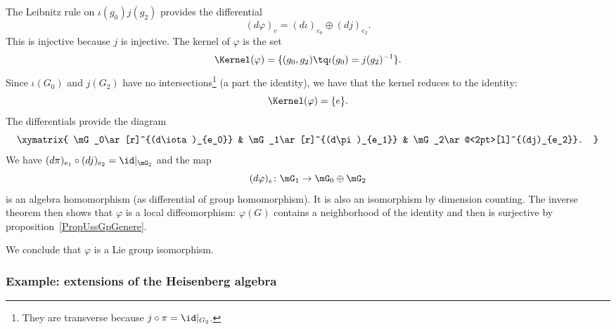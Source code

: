 The Leibnitz rule on $\iota(g_0)j(g_2)$ provides the differential
\begin{equation}
    (d\varphi)_e=(d\iota)_{e_0}\oplus(dj)_{e_2}.
\end{equation}
This is injective because $j$ is injective. The kernel of $\varphi$ is the set
\begin{equation}
    \Kernel(\varphi)=\{ (g_0,g_2)\tq \iota(g_0)=j(g_2)^{-1} \}.
\end{equation}
Since $\iota(G_0)$ and $j(G_2)$ have no intersections\footnote{They are transverse because $j\circ \pi=\id|_{G_2}$.} (a part the identity), we have that the kernel reduces to the identity:
\begin{equation}
    \Kernel(\varphi)=\{ e \}.
\end{equation}
The differentials provide the diagram
\begin{equation}
    \xymatrix{
    \mG_0\ar[r]^{(d\iota)_{e_0}}    &   \mG_1\ar[r]^{(d\pi)_{e_1}}  &   \mG_2\ar@<2pt>[l]^{(dj)_{e_2}}.
    }
\end{equation}
We have $(d\pi)_{e_1}\circ (dj)_{e_2}=\id|_{\mG_2}$ and the map
\begin{equation}
    (d\varphi)_e\colon \mG_1\to \mG_0\oplus\mG_2
\end{equation}
is an algebra homomorphism (as differential of group homomorphism). It is also an isomorphism by dimension counting. The inverse theorem then shows that $\varphi$ is a local diffeomorphism: $\varphi(G)$ contains a neighborhood of the identity and then is surjective by proposition~\ref{PropUssGpGenere}.

We conclude that $\varphi$ is a Lie group isomorphism.

\subsubsection{Example: extensions of the Heisenberg algebra}

